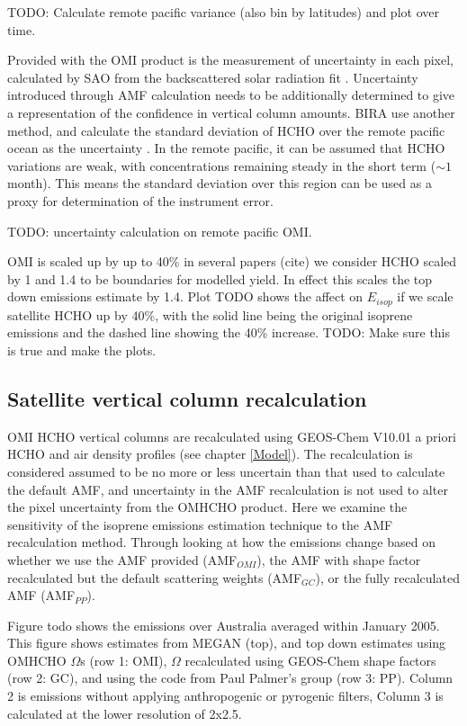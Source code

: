     TODO: Calculate remote pacific variance (also bin by latitudes) and plot over time. 
    
    
    Provided with the OMI product is the measurement of uncertainty in each pixel, calculated by SAO from the backscattered solar radiation fit \parencite{Abad2015,Abad2016}.
    Uncertainty introduced through AMF calculation needs to be additionally determined to give a representation of the confidence in vertical column amounts.
    BIRA use another method, and calculate the standard deviation of HCHO over the remote pacific ocean as the uncertainty \parencite{DeSmedt2012, DeSmedt2015}.
    In the remote pacific, it can be assumed that HCHO variations are weak, with concentrations remaining steady in the short term ($\sim 1$ month).
    This means the standard deviation over this region can be used as a proxy for determination of the instrument error.
    
    
    TODO: uncertainty calculation on remote pacific OMI.
    
    OMI is scaled up by up to 40\% in several papers (cite) we consider HCHO scaled by 1 and 1.4 to be boundaries for modelled yield.
    In effect this scales the top down emissions estimate by 1.4.
    Plot TODO shows the affect on $E_{isop}$ if we scale satellite HCHO up by 40\%, with the solid line being the original isoprene emissions and the dashed line showing the 40\% increase. TODO: Make sure this is true and make the plots.
    
  \subsection{Satellite vertical column recalculation}
    
    OMI HCHO vertical columns are recalculated using GEOS-Chem V10.01 a priori HCHO and air density profiles (see chapter \ref{Model}).
    The recalculation is considered assumed to be no more or less uncertain than that used to calculate the default AMF, and uncertainty in the AMF recalculation is not used to alter the pixel uncertainty from the OMHCHO product.
    Here we examine the sensitivity of the isoprene emissions estimation technique to the AMF recalculation method.
    Through looking at how the emissions change based on whether we use the AMF provided (AMF$_{OMI}$), the AMF with shape factor recalculated but the default scattering weights (AMF$_{GC}$), or the fully recalculated AMF (AMF$_{PP}$).
    
    Figure todo shows the emissions over Australia averaged within January 2005.
    This figure shows estimates from MEGAN (top), and top down estimates using OMHCHO $\Omega$s (row 1: OMI), $\Omega$ recalculated using GEOS-Chem shape factors (row 2: GC), and using the code from Paul Palmer's group (row 3: PP).
    Column 2 is emissions without applying anthropogenic or pyrogenic filters, Column 3 is calculated at the lower resolution of 2x2.5\degr.
    
